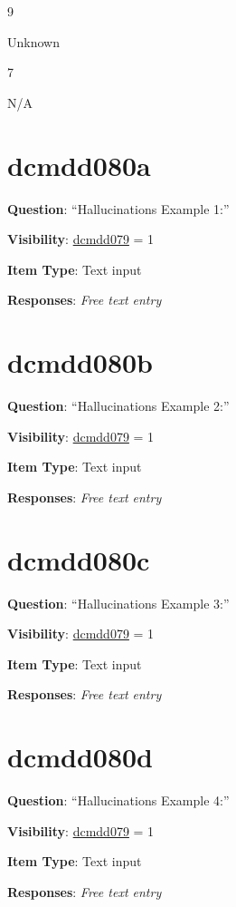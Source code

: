 \documentclass[
]{book}
\begin{document}
9

Unknown

7

N/A

\hypertarget{dcmdd080a}{%
\section{dcmdd080a}\label{dcmdd080a}}

\textbf{Question}: ``Hallucinations Example 1:''

\textbf{Visibility}: \protect\hyperlink{dcmdd079}{dcmdd079} = 1

\textbf{Item Type}: Text input

\textbf{Responses}: \emph{Free text entry}

\hypertarget{dcmdd080b}{%
\section{dcmdd080b}\label{dcmdd080b}}

\textbf{Question}: ``Hallucinations Example 2:''

\textbf{Visibility}: \protect\hyperlink{dcmdd079}{dcmdd079} = 1

\textbf{Item Type}: Text input

\textbf{Responses}: \emph{Free text entry}

\hypertarget{dcmdd080c}{%
\section{dcmdd080c}\label{dcmdd080c}}

\textbf{Question}: ``Hallucinations Example 3:''

\textbf{Visibility}: \protect\hyperlink{dcmdd079}{dcmdd079} = 1

\textbf{Item Type}: Text input

\textbf{Responses}: \emph{Free text entry}

\hypertarget{dcmdd080d}{%
\section{dcmdd080d}\label{dcmdd080d}}

\textbf{Question}: ``Hallucinations Example 4:''

\textbf{Visibility}: \protect\hyperlink{dcmdd079}{dcmdd079} = 1

\textbf{Item Type}: Text input

\textbf{Responses}: \emph{Free text entry}
\end{document}
